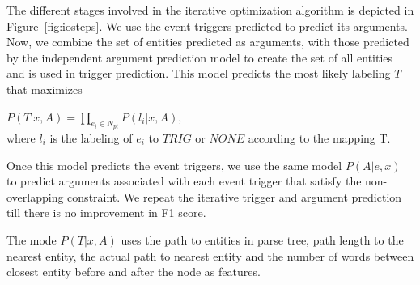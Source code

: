 The different stages involved in the iterative optimization algorithm is depicted in Figure~\ref{fig:iosteps}. We use the event triggers predicted to predict its arguments. Now, we combine the set of entities predicted as arguments, with those predicted by the independent argument prediction model to create the set of all entities and is used in trigger prediction. This model predicts the most likely labeling $T$ that maximizes

$P(T | x, A) = \prod_{e_{i}\in N_{pt}} P(l_{i} | x, A) $,\\
 where $l_i$ is the labeling of $e_i$ to $TRIG$ or $NONE$ according to the mapping T.

Once this model predicts the event triggers, we use the same model $P(A | e,x)$ to predict arguments associated with each event trigger that satisfy the non-overlapping constraint. We repeat the iterative trigger and argument prediction till there is no improvement in F1 score.

The mode $P(T | x, A)$ uses the path to entities in parse tree, path length to the nearest entity, the actual path to nearest entity and the number of words between closest entity before and after the node as features.
